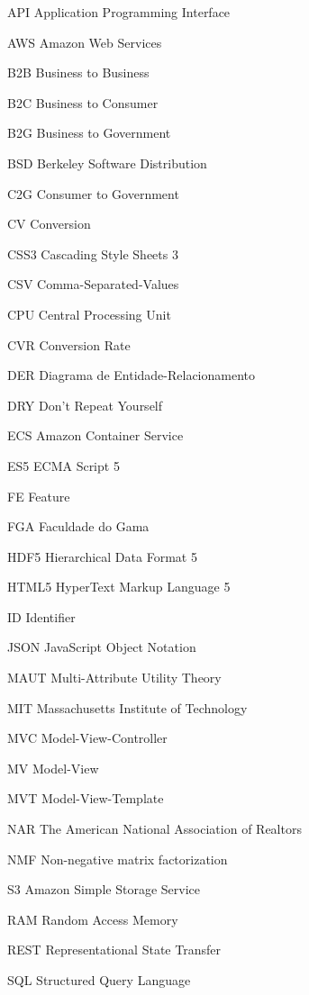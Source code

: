 \begin{siglas}
  \item[API] Application Programming Interface
  \item[AWS] Amazon Web Services
  \item[B2B] Business to Business
  \item[B2C] Business to Consumer
  \item[B2G] Business to Government
  \item[BSD] Berkeley Software Distribution
  \item[C2G] Consumer to Government
  \item[CV] Conversion
  \item[CSS3] Cascading Style Sheets 3
  \item[CSV] Comma-Separated-Values
  \item[CPU] Central Processing Unit
  \item[CVR] Conversion Rate
  \item[DER] Diagrama de Entidade-Relacionamento
  \item[DRY] Don’t Repeat Yourself
  \item[ECS] Amazon Container Service
  \item[ES5] ECMA Script 5
  \item[FE] Feature
  \item[FGA] Faculdade do Gama
  \item[HDF5] Hierarchical Data Format 5
  \item[HTML5] HyperText Markup Language 5
  \item[ID] Identifier
  \item[JSON] JavaScript Object Notation
  \item[MAUT] Multi-Attribute Utility Theory
  \item[MIT] Massachusetts Institute of Technology
  \item[MVC] Model-View-Controller
  \item[MV] Model-View
  \item[MVT] Model-View-Template
  \item[NAR] The American National Association of Realtors
  \item[NMF] Non-negative matrix factorization
  \item[S3] Amazon Simple Storage Service
  \item[RAM] Random Access Memory
  \item[REST] Representational State Transfer
  \item[SQL] Structured Query Language

\end{siglas}
